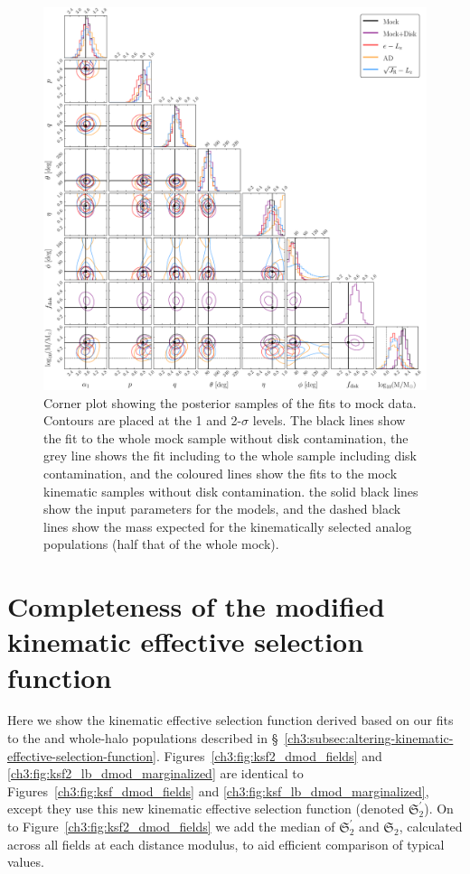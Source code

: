 \begin{figure}
    \centering
    \includegraphics[width=\textwidth]{figure/ch3/mock_posterior.pdf}
    \caption{Corner plot showing the posterior samples of the fits to mock data. Contours are placed at the 1 and 2-$\sigma$ levels. The black lines show the fit to the whole mock sample without disk contamination, the grey line shows the fit including to the whole sample including disk contamination, and the coloured lines show the fits to the mock \gse kinematic samples without disk contamination. the solid black lines show the input parameters for the models, and the dashed black lines show the mass expected for the kinematically selected \gse analog populations (half that of the whole mock).}
    \label{ch3:fig:mock_posterior}
\end{figure}

\section{Completeness of the modified kinematic effective selection function}
\label{ch3:ap:modified-ksf}

Here we show the kinematic effective selection function derived based on our fits to the \gse and whole-halo populations described in \S~\ref{ch3:subsec:altering-kinematic-effective-selection-function}. Figures~\ref{ch3:fig:ksf2_dmod_fields} and \ref{ch3:fig:ksf2_lb_dmod_marginalized} are identical to Figures~\ref{ch3:fig:ksf_dmod_fields} and \ref{ch3:fig:ksf_lb_dmod_marginalized}, except they use this new kinematic effective selection function (denoted $\mathfrak{S}_{2}^{\prime}$). On to Figure~\ref{ch3:fig:ksf2_dmod_fields} we add the median of $\mathfrak{S}_{2}^{\prime}$ and $\mathfrak{S}_{2}$, calculated across all fields at each distance modulus, to aid efficient comparison of typical values.

